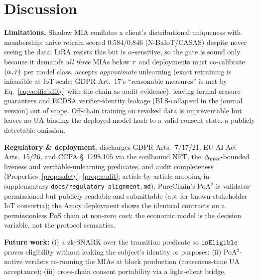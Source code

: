 \section{Discussion}
\label{sec:discussion}

\noindent\textbf{Limitations.}
Shadow MIA conflates a client's distributional uniqueness with
membership: naive retrain scored $0.584$/$0.846$
(N-BaIoT/CASAS) despite never seeing the data; LiRA resists this
but is $\alpha$-sensitive, so the gate is sound only because it
demands \emph{all three} MIAs below $\tau$ and deployments must
co-calibrate $(\alpha,\tau)$ per model class. \sysname accepts
\emph{approximate} unlearning (exact retraining is infeasible at
IoT scale; GDPR Art.~17's ``reasonable measures'' is met by
Eq.~\ref{eq:verifiability} with the chain as audit evidence),
leaving formal-erasure guarantees and ECDSA verifier-identity
leakage (BLS-collapsed in the journal version) out of scope.
Off-chain training on revoked data is unpreventable but leaves no
UA binding the deployed model hash to a valid consent state, a
publicly detectable omission.

\smallskip\noindent\textbf{Regulatory \& deployment.}
\sysname discharges GDPR Arts.~7/17/21, EU AI Act Arts.~15/26, and
CCPA \S~1798.105 via the soulbound NFT, the $\Delta_{\max}$-bounded
liveness and verifiable-unlearning predicates, and audit
completeness (Properties~\ref{prop:safety}--\ref{prop:audit};
article-by-article mapping in supplementary
\texttt{docs/regulatory-alignment.md}). PureChain's PoA$^2$ is
validator-permissioned but publicly readable and submittable (apt
for known-stakeholder IoT consortia); the Amoy deployment shows
the identical contracts on a permissionless PoS chain at non-zero
cost: the economic model is the decision variable, not the
protocol semantics.

\smallskip\noindent\textbf{Future work:}
(i) a zk-SNARK over the \clsm transition predicate so
$\texttt{isEligible}$ proves eligibility without leaking the
subject's identity or purposes; (ii) PoA$^2$-native verifiers
re-running the MIAs at block production (consensus-time UA
acceptance); (iii) cross-chain consent portability via a
light-client bridge.
